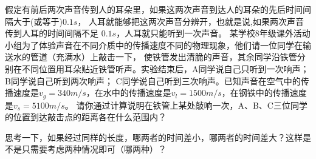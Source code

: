 \documentclass[windows,csize4, answers]{BHCexam}
\begin{document}
\begin{groups}
\begin{questions}[]
        \question[5] 假定有前后两次声音传到人的耳朵里，如果这两次声音到达人的耳朵的先后时间间隔大于(或等于)$0.1s$，
        人耳就能够把这两次声音分辨开，也就是说,如果两次声音传到人耳的时间间隔不足 $0.1 s$，人耳就只能听到一次声音。
        某学校8年级课外活动小组为了体验声音在不同介质中的传播速度不同的物理现象，他们请一位同学在输送水的管道（充满水）上敲击一下，
        使铁管发出清脆的声音，其余同学沿铁管分别在不同位置用耳朵贴近铁管听声。实验结束后，A同学说自己只听到一次响声；B同学说自己听到两次响声；
        C同学说自己听到三次响声。已知声音在空气中的传播速度是$v_g=340 m/s$，在水中的传播速度是$v_l=1500 m/s$，在钢铁中的传播速度是$v_s=5100m/s$。
        请你通过计算说明在铁管上某处敲响一次，A、B、C三位同学的位置到达敲击点的距离各在什么范围内？
        \begin{solution}{0.5cm}
            \methodonly 思考一下，如果经过同样的长度，哪两者的时间差小，哪两者的时间差大？这样是不是只需要考虑两种情况即可（哪两种）？
        \end{solution}



    \end{questions}
















\end{groups}




\label{lastpage}
\end{document}
